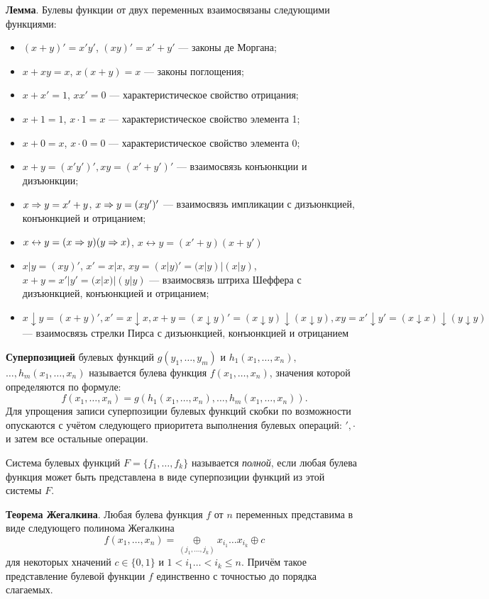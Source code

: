 \textbf{Лемма}. Булевы функции от двух переменных взаимосвязаны следующими функциями:
\begin{itemize}
    \item $(x+y)'=x'y'$, $(xy)'=x'+y'$ --- законы де Моргана;
    \item $x+xy=x$, $x(x+y)=x$ --- законы поглощения;
    \item $x+x'=1$, $xx'=0$ --- характеристическое свойство отрицания;
    \item $x+1=1$, $x\cdot 1=x$ --- характеристическое свойство элемента 1;
    \item $x+0=x$, $x\cdot 0 = 0$ --- характеристическое свойство элемента 0;
    \item $x+y=(x'y')', xy=(x'+y')'$ --- взаимосвязь конъюнкции и дизъюнкции;
    \item $x\Rightarrow y=x'+y$, $x\Rightarrow y=(xy')'$ --- взаимосвязь импликации с дизъюнкцией, конъюнкцией и отрицанием;
    \item $x \leftrightarrow y = (x \Rightarrow y)(y \Rightarrow x)$, $x \leftrightarrow y = (x' + y)(x + y')$
    \item $x | y = (xy)'$, $x'=x|x$, $xy=(x|y)'=(x|y)|(x|y)$, $x+y=x'|y'=(x|x)|(y|y)$ --- взаимосвязь штриха Шеффера с дизъюнкцией, конъюнкцией и отрицанием;
    \item $x\downarrow y = (x+y)', x'=x \downarrow x, x + y = (x \downarrow y)' = (x \downarrow y) \downarrow (x \downarrow y), xy=x'\downarrow y' = (x\downarrow x) \downarrow (y \downarrow y)$ --- взаимосвязь стрелки Пирса с дизъюнкцией, конъюнкцией и отрицанием
\end{itemize}

\dftion \textbf{Суперпозицией} булевых функций $g(y_1,\dots,y_m)$ и $h_1(x_1,\dots,x_n),$ $\dots,h_m(x_1,\dots,x_n)$ называется булева функция $f(x_1, \dots, x_n)$, значения которой определяются по формуле:
$$f(x_1,\dots,x_n) = g(h_1(x_1,\dots,x_n), \dots, h_m(x_1,\dots,x_n)).$$
Для упрощения записи суперпозиции булевых функций скобки по возможности опускаются с учётом следующего приоритета выполнения булевых операций: $',\cdot$ и затем все остальные операции.

\dftion Система булевых функций $F=\{f_1,\dots,f_k\}$ называется \textit{полной}, если любая булева функция может быть представлена в виде суперпозиции функций из этой системы $F$.

\textbf{Теорема Жегалкина}. Любая булева функция $f$ от $n$  переменных представима в виде следующего полинома Жегалкина
$$f(x_1,\dots,x_n) = \underset{(j_1,\dots,j_k)}\oplus x_{i_1}\dots x_{i_k} \oplus c$$
для некоторых хначений $c \in \{0,1\}$ и $1 < i_1 \dots < i_k \leq n$. Причём такое представление булевой функции $f$ единственно с точностью до порядка слагаемых.

